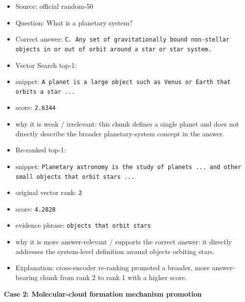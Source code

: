 \documentclass[12pt,a4paper]{article}
\begin{document}
\begin{itemize}
    \item Source: official random-50
    \item Question: What is a planetary system?
    \item Correct answer: \texttt{C. Any set of gravitationally bound non-stellar objects in or out of orbit around a star or star system.}
    \item Vector Search top-1:
    \item snippet: \texttt{A planet is a large object such as Venus or Earth that orbits a star ...}
    \item score: \texttt{2.6344}
    \item why it is weak / irrelevant: this chunk defines a single planet and does not directly describe the broader planetary-system concept in the answer.
    \item Re-ranked top-1:
    \item snippet: \texttt{Planetary astronomy is the study of planets ... and other small objects that orbit stars ...}
    \item original vector rank: \texttt{2}
    \item score: \texttt{4.2828}
    \item evidence phrase: \texttt{objects that orbit stars}
    \item why it is more answer-relevant / supports the correct answer: it directly addresses the system-level definition around objects orbiting stars.
    \item Explanation: cross-encoder re-ranking promoted a broader, more answer-bearing chunk from rank 2 to rank 1 with a higher score.
\end{itemize}

\textbf{Case 2: Molecular-cloud formation mechanism promotion}
\end{document}
